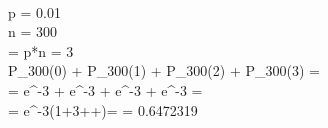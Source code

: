 \\ p = 0.01
\\ n = 300
\\ \lambda = p*n = 3
\\ P_{300}(0) + P_{300}(1) + P_{300}(2) + P_{300}(3) =
\\ =  e^{-3} +  e^{-3} +  e^{-3} +  e^{-3} =
\\ = e^{-3}(1+3++)= = 0.6472319
